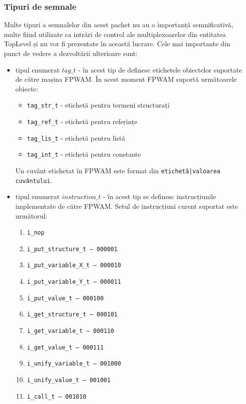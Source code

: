 \documentclass[12pt,a4paper,twoside]{report}
\begin{document}
\subsubsection{Tipuri de semnale}
Multe tipuri a semnalelor din acest pachet nu au o importanță semnificativă, multe fiind utilizate ca intrări de control ale multiplexoarelor din entitatea TopLevel și nu vor fi prezentate în această lucrare. Cele mai importante din punct de vedere a dezvoltării ulterioare sunt:
\begin{itemize}
\item tipul enumerat $tag\_t$ - în acest tip de definesc etichetele obiectelor suportate de către mașina FPWAM. În acest moment FPWAM suportă următoarele obiecte: 
	\begin{itemize}
    	\item \texttt{tag\_str\_t} - etichetă pentru termeni structurați
	\item \texttt{tag\_ref\_t} - etichetă pentru referințe
	\item \texttt{tag\_lis\_t} - etichetă pentru listă
	\item \texttt{tag\_int\_t} -  etichetă pentru constante
	\end{itemize}
Un cuvânt etichetat în FPWAM este format din \texttt{etichetă|valoarea cuvântului}.
\item tipul enumerat $instruction\_t$ - în acest tip se definesc instrucțiunile implementate de către FPWAM. Setul de instrucțiuni curent suportat este următorul:
	\begin{enumerate}
        	  \item \texttt{i\_nop}
           \item \texttt{i\_put\_structure\_t     -- 000001}
           \item \texttt{i\_put\_variable\_X\_t    -- 000010}
           \item \texttt{i\_put\_variable\_Y\_t    -- 000011}
           \item \texttt{i\_put\_value\_t         -- 000100}
           \item \texttt{i\_get\_structure\_t     -- 000101}
           \item \texttt{i\_get\_variable\_t      -- 000110}
           \item \texttt{i\_get\_value\_t         -- 000111}
           \item \texttt{i\_unify\_variable\_t    -- 001000}
           \item \texttt{i\_unify\_value\_t       -- 001001}
           \item \texttt{i\_call\_t              -- 001010}

\end{enumerate}
\end{itemize}
\end{document}
